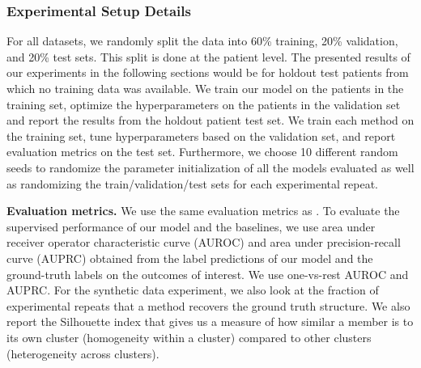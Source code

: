 \subsubsection{Experimental Setup Details}
\label{ch02:sec:ExperimentalSetup}

For all datasets, we randomly split the data into 60\% training, 20\% validation, and 20\% test sets. 
This split is done at the patient level.
The presented results of our experiments in the following sections would be for holdout test patients from which no training data was available.
We train our model on the patients in the training set, optimize the hyperparameters on the patients in the validation set and report the results from the holdout patient test set. 
We train each method on the training set, tune hyperparameters based on the validation set, and report evaluation metrics on the test set.
Furthermore, we choose 10 different random seeds to randomize the parameter initialization of all the models evaluated as well as randomizing the train/validation/test sets for each experimental repeat.


\noindent
\textbf{Evaluation metrics.}
We use the same evaluation metrics as \citet{lee2020temporal}.
To evaluate the supervised performance of our model and the baselines, we use area under receiver operator characteristic curve (AUROC) and area under precision-recall curve (AUPRC) obtained from the label predictions of our model and the ground-truth labels on the outcomes of interest. We use one-vs-rest AUROC and AUPRC.
For the synthetic data experiment, we also look at the fraction of experimental repeats that a method recovers the ground truth structure.
We also report the Silhouette index \citep{rousseeuw1987silhouettes} that gives us a measure of how similar a member is to its own cluster (homogeneity within a cluster) compared to other clusters (heterogeneity across clusters). 

